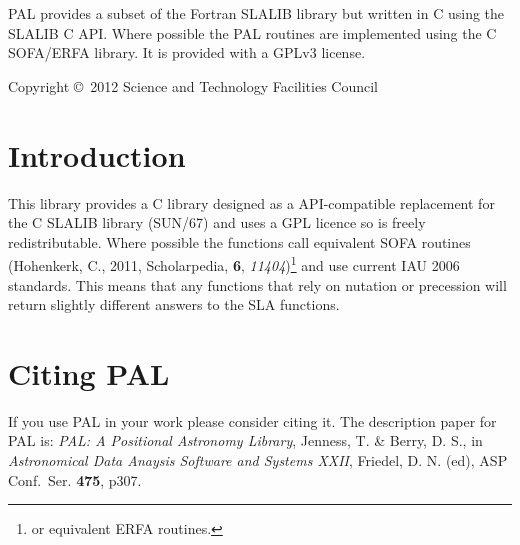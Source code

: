 \documentclass[twoside,11pt]{article}
\newcommand{\stardocinitials}  {SUN}
\newcommand{\stardoccopyright}
{Copyright \copyright\ 2012 Science and Technology Facilities Council}
\newcommand{\stardocnumber}    {267.1}
\newcommand{\stardocabstract}  {
PAL provides a subset of the Fortran SLALIB library but written in C
using the SLALIB C API. Where possible the PAL routines are
implemented using the C SOFA/ERFA library. It is provided with a GPLv3 license.
}
\newcommand{\stardocname}{\stardocinitials /\stardocnumber}
\newenvironment{latexonly}{}{}
\renewcommand{\_}{\texttt{\symbol{95}}}
\renewcommand{\thepage}{\roman{page}}
\begin{document}
\stardocabstract

\begin{latexonly}
\newpage
\vspace*{\fill}
\stardoccopyright
\end{latexonly}


\cleardoublepage
\renewcommand{\thepage}{\arabic{page}}
\setcounter{page}{1}


\section{Introduction}

This library provides a C library designed as a API-compatible
replacement for the C SLALIB library (SUN/67) and uses a GPL licence so is
freely redistributable. Where possible the functions call equivalent
SOFA routines (Hohenkerk, C., 2011, Scholarpedia, \textbf{6}, \emph{11404})\footnote{or equivalent ERFA routines.}
and use current IAU 2006 standards. This means that any
functions that rely on nutation or precession will return slightly
different answers to the SLA functions.

\section{Citing PAL}

If you use PAL in your work please consider citing it. The description paper
for PAL is: \emph{PAL: A Positional Astronomy Library}, Jenness, T. \& Berry, D. S.,
in \emph{Astronomical Data Anaysis Software and Systems XXII}, Friedel, D. N. (ed),
ASP Conf.\ Ser. \textbf{475}, p307.
\end{document}

